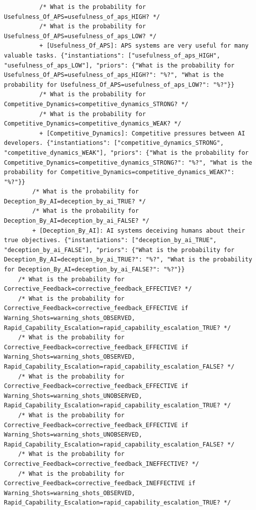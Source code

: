 \documentclass[
  11pt,
  letterpaper,
]{book}
\begin{document}
\begin{verbatim}
          /* What is the probability for Usefulness_Of_APS=usefulness_of_aps_HIGH? */
          /* What is the probability for Usefulness_Of_APS=usefulness_of_aps_LOW? */
          + [Usefulness_Of_APS]: APS systems are very useful for many valuable tasks. {"instantiations": ["usefulness_of_aps_HIGH", "usefulness_of_aps_LOW"], "priors": {"What is the probability for Usefulness_Of_APS=usefulness_of_aps_HIGH?": "%?", "What is the probability for Usefulness_Of_APS=usefulness_of_aps_LOW?": "%?"}}
          /* What is the probability for Competitive_Dynamics=competitive_dynamics_STRONG? */
          /* What is the probability for Competitive_Dynamics=competitive_dynamics_WEAK? */
          + [Competitive_Dynamics]: Competitive pressures between AI developers. {"instantiations": ["competitive_dynamics_STRONG", "competitive_dynamics_WEAK"], "priors": {"What is the probability for Competitive_Dynamics=competitive_dynamics_STRONG?": "%?", "What is the probability for Competitive_Dynamics=competitive_dynamics_WEAK?": "%?"}}
        /* What is the probability for Deception_By_AI=deception_by_ai_TRUE? */
        /* What is the probability for Deception_By_AI=deception_by_ai_FALSE? */
        + [Deception_By_AI]: AI systems deceiving humans about their true objectives. {"instantiations": ["deception_by_ai_TRUE", "deception_by_ai_FALSE"], "priors": {"What is the probability for Deception_By_AI=deception_by_ai_TRUE?": "%?", "What is the probability for Deception_By_AI=deception_by_ai_FALSE?": "%?"}}
    /* What is the probability for Corrective_Feedback=corrective_feedback_EFFECTIVE? */
    /* What is the probability for Corrective_Feedback=corrective_feedback_EFFECTIVE if Warning_Shots=warning_shots_OBSERVED, Rapid_Capability_Escalation=rapid_capability_escalation_TRUE? */
    /* What is the probability for Corrective_Feedback=corrective_feedback_EFFECTIVE if Warning_Shots=warning_shots_OBSERVED, Rapid_Capability_Escalation=rapid_capability_escalation_FALSE? */
    /* What is the probability for Corrective_Feedback=corrective_feedback_EFFECTIVE if Warning_Shots=warning_shots_UNOBSERVED, Rapid_Capability_Escalation=rapid_capability_escalation_TRUE? */
    /* What is the probability for Corrective_Feedback=corrective_feedback_EFFECTIVE if Warning_Shots=warning_shots_UNOBSERVED, Rapid_Capability_Escalation=rapid_capability_escalation_FALSE? */
    /* What is the probability for Corrective_Feedback=corrective_feedback_INEFFECTIVE? */
    /* What is the probability for Corrective_Feedback=corrective_feedback_INEFFECTIVE if Warning_Shots=warning_shots_OBSERVED, Rapid_Capability_Escalation=rapid_capability_escalation_TRUE? */

\end{verbatim}
\end{document}
